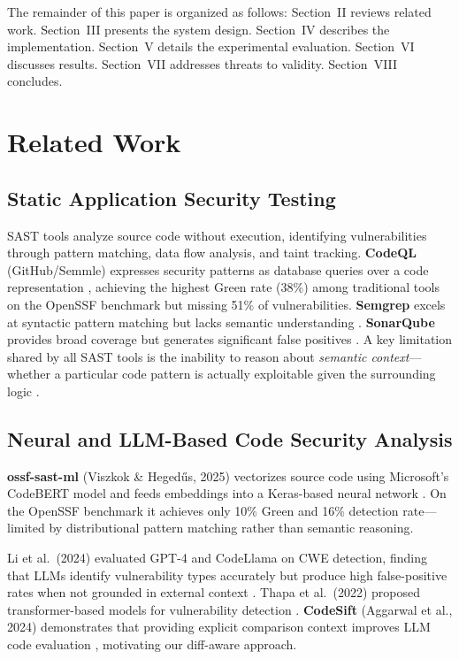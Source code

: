 \documentclass[conference]{IEEEtran}
\begin{document}
The remainder of this paper is organized as follows: Section~II reviews related work. Section~III presents the system design. Section~IV describes the implementation. Section~V details the experimental evaluation. Section~VI discusses results. Section~VII addresses threats to validity. Section~VIII concludes.

\section{Related Work}

\subsection{Static Application Security Testing}

SAST tools analyze source code without execution, identifying vulnerabilities through pattern matching, data flow analysis, and taint tracking. \textbf{CodeQL} (GitHub/Semmle) expresses security patterns as database queries over a code representation \cite{b8}, achieving the highest Green rate (38\%) among traditional tools on the OpenSSF benchmark but missing 51\% of vulnerabilities. \textbf{Semgrep} excels at syntactic pattern matching but lacks semantic understanding \cite{b9}. \textbf{SonarQube} provides broad coverage but generates significant false positives \cite{b10}. A key limitation shared by all SAST tools is the inability to reason about \textit{semantic context}---whether a particular code pattern is actually exploitable given the surrounding logic \cite{b11}.

\subsection{Neural and LLM-Based Code Security Analysis}

\textbf{ossf-sast-ml} (Viszkok \& Heged\H{u}s, 2025) vectorizes source code using Microsoft's CodeBERT model and feeds embeddings into a Keras-based neural network \cite{b5}. On the OpenSSF benchmark it achieves only 10\% Green and 16\% detection rate---limited by distributional pattern matching rather than semantic reasoning.

Li et al.\ (2024) evaluated GPT-4 and CodeLlama on CWE detection, finding that LLMs identify vulnerability types accurately but produce high false-positive rates when not grounded in external context \cite{b12}. Thapa et al.\ (2022) proposed transformer-based models for vulnerability detection \cite{b13}. \textbf{CodeSift} (Aggarwal et al., 2024) demonstrates that providing explicit comparison context improves LLM code evaluation \cite{b7}, motivating our diff-aware approach.
\end{document}

